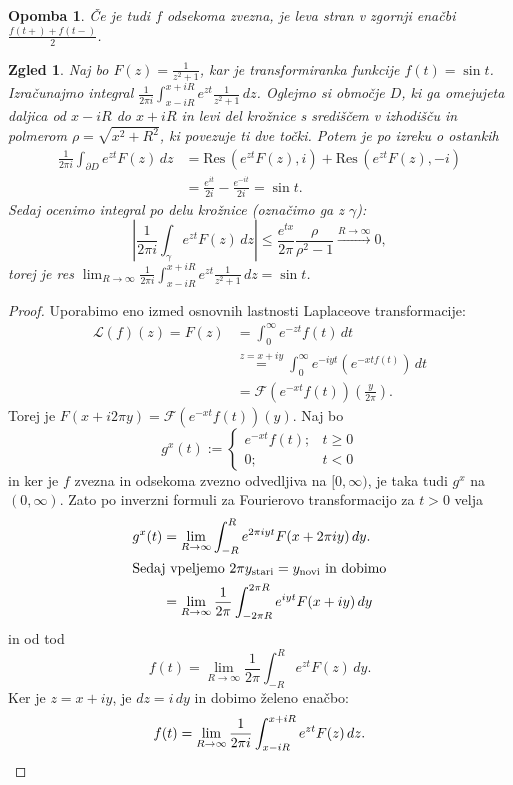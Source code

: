 \documentclass[10pt, a4paper]{article}
\newtheorem*{opomba}{Opomba}
\newtheorem{zgled}{Zgled}[section]
\newenvironment{noticeC}{%
  \tcolorbox[%
  notitle,
  empty,
  enhanced,  %
  breakable,
  coltext=black, 
  fontupper=\rmfamily,
  parbox=false,
  noparskip,
  sharp corners,
  boxrule=-1pt,  %
  frame hidden,
  left=7pt,  %
  right=7pt,
  top=5pt,
  bottom=5pt,
  before skip=2.5ex plus 2pt,
  after skip=2.5ex plus 2pt,
  overlay unbroken and last={%
  },
  ]}
{\endtcolorbox}
\newenvironment{dokaz}%
  {\begin{noticeC}\begin{proof}}%
  {\end{proof}\end{noticeC}}
\newcommand{\res}[2]{\mathrm{Res}\, \left(#1, #2\right)}
\begin{document}
\begin{opomba}
  Če je tudi $f$ odsekoma zvezna, je leva stran v zgornji enačbi $\frac{f(t+) + f(t-)}{2}$.
\end{opomba}

\begin{zgled}
  Naj bo $F(z) = \frac{1}{z^2 + 1}$, kar je transformiranka funkcije $f(t) = \sin t$.
  Izračunajmo integral $\frac{1}{2 \pi i} \int_{x - iR} ^{x + iR} e^{zt} \frac{1}{z^2 + 1}\, dz$.
  Oglejmo si območje $D$, ki ga omejujeta daljica od $x -iR$ do $x + iR$
  in levi del krožnice s središčem v izhodišču in polmerom $\rho = \sqrt{x^2 + R^2}$,
  ki povezuje ti dve točki.
  Potem je po izreku o ostankih 
  \begin{align*}
    \frac{1}{2 \pi i} \int_{\partial D} e^{zt} F(z)\, dz &= \res{e^{zt} F(z)}{i} + \res{e^{zt} F(z)}{-i}\\
    &= \frac{e^{it}}{2i} - \frac{e^{-it}}{2i} = \sin t.
  \end{align*}
  Sedaj ocenimo integral po delu krožnice (označimo ga z $\gamma$):
  $$\left| \frac{1}{2 \pi i} \int_{\gamma} e^{zt} F(z)\, dz \right| \leq \frac{e^{tx} }{2 \pi} \frac{\rho}{\rho^2 - 1} \stackrel{R \to \infty}{\to} 0,$$
  torej je res $\lim_{R \to \infty} \frac{1}{2 \pi i} \int_{x - iR} ^{x + iR} e^{zt} \frac{1}{z^2 + 1}\, dz = \sin t$.
\end{zgled}

\begin{dokaz}
  Uporabimo eno izmed osnovnih lastnosti Laplaceove transformacije:
  \begin{align*}
    \mathcal{L} (f) (z) = F(z) &=\int_0 ^\infty e^{-zt} f(t)\, dt\\
    &\stackrel{z = x + iy}{=} \int_0 ^\infty e^{-iyt} \left(e^{-xt f(t)}\right)\, dt\\
    &= \mathcal{F} (e^{-xt} f(t)) \left(\frac{y}{2 \pi}\right).
  \end{align*}
  Torej je $F(x + i 2 \pi y) = \mathcal{F} (e^{-xt} f(t)) (y)$.
  Naj bo $$g^x (t) := \begin{cases}
    e^{-xt} f(t); & t \geq 0\\
    0; &t < 0
  \end{cases}$$
  in ker je $f$ zvezna in odsekoma zvezno odvedljiva na $[0, \infty)$,
  je taka tudi $g^x$ na $(0, \infty)$. Zato po inverzni formuli za Fourierovo transformacijo za $t > 0$ velja
  \begin{align*}
    g^x (t) &= \lim_{R \to \infty} \int_{-R} ^R e^{2 \pi i yt} F(x + 2 \pi i y)\, dy.\\
    \intertext{Sedaj vpeljemo $2 \pi y_{\mathrm{stari}} = y_{\mathrm{novi}}$ in dobimo}
    &= \lim_{R \to \infty} \frac{1}{2 \pi} \int_{-2 \pi R} ^{2 \pi R} e^{iyt} F(x + iy)\, dy
  \end{align*}
  in od tod $$f(t) = \lim_{R \to \infty} \frac{1}{2 \pi} \int_{-R} ^R e^{zt} F(z)\, dy.$$
  Ker je $z = x + iy$, je $dz = i\, dy$ in dobimo želeno enačbo:
  \begin{equation*}
    f(t) = \lim_{R \to \infty} \frac{1}{2 \pi i} \int_{x - iR} ^{x + iR} e^{zt} F(z)\, dz. \qedhere
  \end{equation*}
\end{dokaz}
\end{document}
